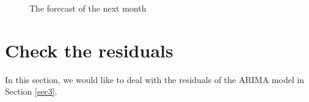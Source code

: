 \documentclass{article}
\begin{document}
\begin{figure}[H]
    \centering
    \quad
    \caption{The forecast of the next month}
    \label{BABA-arima-forecast}
\end{figure}

\vspace{4pt}
\section{Check the residuals}
In this section, we would like to deal with the residuals of the ARIMA model in Section \ref{sec3}.
\vspace{4pt}
\end{document}
